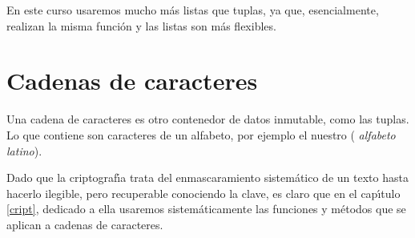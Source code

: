 En este curso usaremos mucho m\'as listas que tuplas, ya que, esencialmente,
realizan la misma funci\'on y las listas son m\'as flexibles. 

\section{Cadenas de caracteres}

Una cadena de caracteres es otro contenedor de datos inmutable, como las tuplas.
Lo que contiene son caracteres de un alfabeto, por ejemplo el nuestro ({\itshape
alfabeto latino}).

Dado que la {\sc criptograf\'{\i}a}  trata del enmascaramiento sistem\'atico de
un texto hasta hacerlo ilegible, pero recuperable conociendo la clave, es claro
que en el cap\'{\i}tulo \ref{cript}, dedicado a ella usaremos sistem\'aticamente
las funciones y m\'etodos que se aplican a  cadenas de caracteres.

